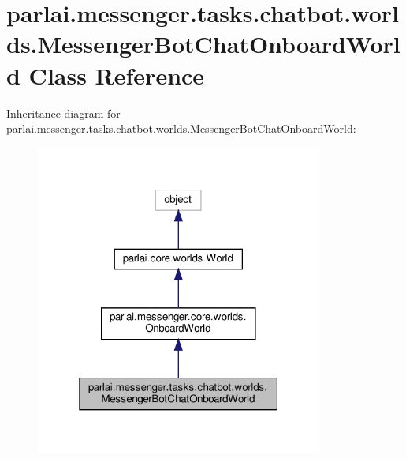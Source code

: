 \hypertarget{classparlai_1_1messenger_1_1tasks_1_1chatbot_1_1worlds_1_1MessengerBotChatOnboardWorld}{}\section{parlai.\+messenger.\+tasks.\+chatbot.\+worlds.\+Messenger\+Bot\+Chat\+Onboard\+World Class Reference}
\label{classparlai_1_1messenger_1_1tasks_1_1chatbot_1_1worlds_1_1MessengerBotChatOnboardWorld}


Inheritance diagram for parlai.\+messenger.\+tasks.\+chatbot.\+worlds.\+Messenger\+Bot\+Chat\+Onboard\+World\+:
\nopagebreak
\begin{figure}[H]
\begin{center}
\leavevmode
\includegraphics[width=268pt]{classparlai_1_1messenger_1_1tasks_1_1chatbot_1_1worlds_1_1MessengerBotChatOnboardWorld__inherit__graph}
\end{center}
\end{figure}


